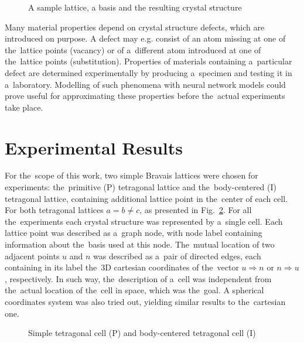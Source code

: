 \documentclass{llncs}
\begin{document}
\begin{figure}[h!]
\begin{center}
	\caption[]{A sample lattice, a basis and the resulting crystal structure}
	\label{fig:lattice}
\end{center}
\end{figure}


\noindent Many material properties depend on crystal structure defects, which are introduced on purpose. A defect may e.g. consist of an atom missing at one of the~lattice points (vacancy) or of a~different atom introduced at one of the~lattice points (substitution). Properties of materials containing a~particular defect are determined experimentally by producing a~specimen and testing it in a~laboratory. Modelling of such phenomena with neural network models could prove useful for approximating these properties before the~actual experiments take place.

\section{Experimental Results}
For the~scope of this work, two simple Bravais lattices were chosen for experiments: the~primitive (P) tetragonal lattice and the~body-centered (I) tetragonal lattice, containing additional lattice point in the~center of each cell. For both tetragonal lattices $a = b \neq c$, as presented in Fig.~\ref{fig:bravais}. For all the~experiments each crystal structure was represented by a~single cell. Each lattice point was described as a~graph node, with node label containing information about the~basis used at this node. The~mutual location of two adjacent points $u$ and $n$ was described as a~pair of directed edges, each containing in its label the~3D cartesian coordinates of the~vector $u \Rightarrow n$ or $n \Rightarrow u$, respectively. In such way, the~description of a~cell was independent from the~actual location of the~cell in space, which was the~goal. A spherical coordinates system was also tried out, yielding similar results to the~cartesian one.


\begin{figure}[h!]
\begin{center}
	\caption[]{Simple tetragonal cell (P) and body-centered tetragonal cell (I)}
	\label{fig:bravais}
\end{center}
\end{figure}
\end{document}
